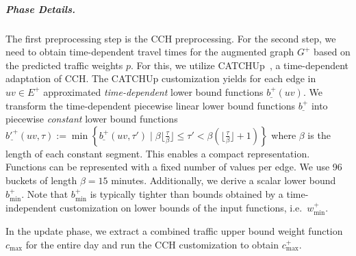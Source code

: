 \documentclass[a4paper,UKenglish,cleveref, autoref, thm-restate]{lipics-v2021}
\newcommand*{\comb}{c}
\newcommand*{\pcfn}{\underline{b'^+}}
\newcommand*{\bucketlen}{\beta}
\begin{document}
\subparagraph{Phase Details.}
The first preprocessing step is the CCH preprocessing.
For the second step, we need to obtain time-dependent travel times for the augmented graph $G^+$ based on the predicted traffic weights $p$.
For this, we utilize CATCHUp~\cite{swz-sfert-21}, a time-dependent adaptation of CCH.
The CATCHUp customization yields for each edge in $uv \in E^+$ approximated \emph{time-dependent} lower bound functions $\underline{b^+}(uv)$.
We transform the time-dependent piecewise linear lower bound functions $\underline{b^+}$ into piecewise \emph{constant} lower bound functions
$\pcfn(uv, \tau) := \min \left\{ \underline{b^+}(uv, \tau') \mid \bucketlen  \lfloor \frac{\tau}{\bucketlen} \rfloor \leq \tau' < \bucketlen (\lfloor \frac{\tau}{\bucketlen} \rfloor + 1) \right\}$
where $\bucketlen$ is the length of each constant segment.
This enables a compact representation.
Functions can be represented with a fixed number of values per edge.
We use 96 buckets of length $\bucketlen = 15$ minutes.
Additionally, we derive a scalar lower bound $b^+_{\min}$.
Note that $b^+_{\min}$ is typically tighter than bounds obtained by a time-independent customization on lower bounds of the input functions, i.e.\ $w^+_{\min}$.

In the update phase, we extract a combined traffic upper bound weight function $\comb_{\max}$ for the entire day and run the CCH customization to obtain $\comb^+_{\max}$.
\end{document}
